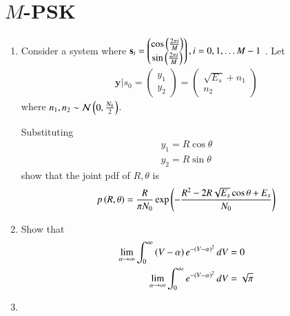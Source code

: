 \documentclass[journal,12pt,twocolumn]{IEEEtran}
\renewcommand\thesection{\arabic{section}}
\begin{document}
\section{$M$-PSK}
\begin{enumerate}[label=\arabic*.,ref=\thesection.\theenumi]

\item Consider a system where 
$\mathbf{s}_i=
\begin{pmatrix}
\cos\left(\frac{2\pi i}{M}\right)\\
\sin\left(\frac{2\pi i}{M}\right)
\end{pmatrix}, i = 0, 1 , \dots M-1
$
.
Let
%
\begin{align}
\mathbf{y}|s_0 = 
\begin{pmatrix}
y_1\\
y_2
\end{pmatrix}
=
\begin{pmatrix}
\sqrt{E_s}+n_1\\
n_2
\end{pmatrix}
\end{align}
where $n_1,n_2 \sim \mathcal{N}\left(0,\frac{N_0}{2}\right)$.

 Substituting 
\begin{align}
y_1=R\cos \theta \\
y_2=R\sin \theta
\end{align}
show that the joint pdf of $R,\theta$ is
%
\begin{equation}
p\left(R,\theta\right)=\frac{R}{\pi N_0}\exp\left(-\frac{R^2-2R\sqrt{E_s}\cos \theta + E_s}{N_0}\right)
\end{equation}
\item

Show that 
%
\begin{align}
\label{eq:mpsk_alpha1}
\lim_{\alpha \rightarrow \infty}\int_{0}^{\infty}\left(V-\alpha \right)e^{-\left(V-\alpha\right)^2 }\,dV
&= 0
\\
\label{eq:mpsk_alpha2}
\lim_{\alpha \rightarrow \infty}\int_{0}^{\infty} e^{-\left(V-\alpha\right)^2 }\,dV
&=  \sqrt{\pi}
\end{align}
\item


\end{enumerate}
\end{document}

